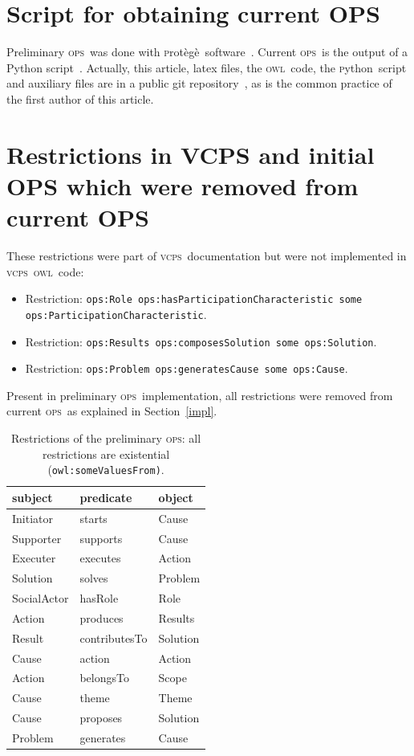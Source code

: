 \documentclass[10pt,letterpaper]{article}
\newcommand{\ops}{\textsc{ops}}
\newcommand{\vcps}{\textsc{vcps}}
\newcommand{\owl}{\textsc{owl}}
\newcommand{\python}{\textsc{p}ython}
\newcommand{\protege}{\textsc{p}rot\`eg\`e}
\begin{document}
\appendix

\section{Script for obtaining current OPS}\label{ap:script}
Preliminary \ops\ was done with \protege\ software~\cite{protege}.
Current \ops\ is the output of a Python script~\cite{opsScript}.
Actually, this article, latex files, the \owl\ code, the \python\ script 
and auxiliary files are in a public git repository~\cite{opsRepo},
as is the common practice of the first author of this article.

\section{Restrictions in VCPS and initial OPS which were removed from current OPS}\label{ap:restr}
These restrictions were part of \vcps\ documentation but were not implemented in \vcps\ \owl\ code:
\begin{itemize}
    \item Restriction: {\tt ops:Role ops:hasParticipationCharacteristic some ops:ParticipationCharacteristic}.
    \item Restriction: {\tt ops:Results ops:composesSolution some ops:Solution}.
    \item Restriction: {\tt ops:Problem ops:generatesCause some ops:Cause}.
\end{itemize}

Present in preliminary \ops\ implementation,
all restrictions were removed from current \ops\ as explained in Section~\ref{impl}.
\begin{table}[!h]
  \centering
  \caption{Restrictions of the preliminary \ops: all restrictions are existential (\texttt{owl:someValuesFrom)}.}
  \begin{tabular}{|l|l|l|}\hline
{\bf subject} & {\bf predicate} & {\bf object} \\\hline\hline
Initiator    & starts        & Cause\\\hline
Supporter    & supports      & Cause\\\hline
Executer     & executes     & Action\\\hline
Solution     & solves      & Problem\\\hline
SocialActor  & hasRole            & Role\\\hline
Action       & produces    & Results\\\hline
Result       & contributesTo   & Solution\\\hline
Cause        & action          & Action\\\hline
Action       & belongsTo     & Scope\\\hline
Cause        & theme           & Theme\\\hline
Cause        & proposes   & Solution\\\hline
Problem      & generates     & Cause\\\hline
  \end{tabular}
  \label{ospRestr}
\end{table}
\end{document}
